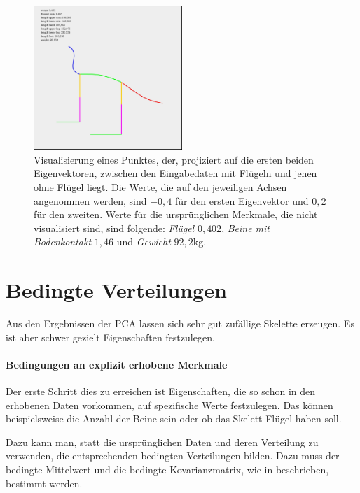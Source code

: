  \begin{figure}
  \centering
  \includegraphics[width=0.5\textwidth]{graphics/betweenClusters.jpg}
  \caption{Visualisierung eines Punktes, der, projiziert auf die ersten beiden Eigenvektoren, zwischen den Eingabedaten mit Flügeln und jenen ohne Flügel liegt. Die Werte, die auf den jeweiligen Achsen angenommen werden, sind $-0{,}4$ für den ersten Eigenvektor und $0{,}2$ für den zweiten. Werte für die ursprünglichen Merkmale, die nicht visualisiert sind, sind folgende: \emph{Flügel} $0{,}402$, \emph{Beine mit Bodenkontakt} $1{,}46$ und \emph{Gewicht} $92{,}2$kg.}
  \label{between_clusters}
 \end{figure}

 
 
 \section{Bedingte Verteilungen}
 \label{pca_conditions}
 
 Aus den Ergebnissen der PCA lassen sich sehr gut zufällige Skelette erzeugen. Es ist aber schwer gezielt Eigenschaften festzulegen.
 
 \paragraph{Bedingungen an explizit erhobene Merkmale}
 Der erste Schritt dies zu erreichen ist Eigenschaften, die so schon in den erhobenen Daten vorkommen, auf spezifische Werte festzulegen. Das können beispielsweise die Anzahl der Beine sein oder ob das Skelett Flügel haben soll.
 
 Dazu kann man, statt die ursprünglichen Daten und deren Verteilung zu verwenden, die entsprechenden bedingten Verteilungen bilden. Dazu muss der bedingte Mittelwert und die bedingte Kovarianzmatrix, wie in \cite[S.\ $116$ f.]{conditionalDistribution} beschrieben, bestimmt werden.
 
